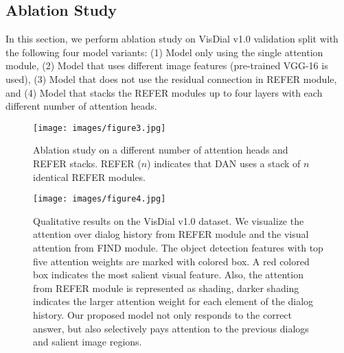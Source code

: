 \documentclass[11pt,a4paper]{article}
\begin{document}
\subsection{Ablation Study}
\label{sec:abl}
In this section, we perform ablation study on VisDial v1.0 validation split with the following four model variants: (1) Model only using the single attention module, (2) Model that uses different image features (pre-trained VGG-16 is used), (3) Model that does not use the residual connection in REFER module, and (4) Model that stacks the REFER modules up to four layers with each different number of attention heads.
\begin{table}
\centering
{}
\caption{Ablation studies on VisDial v1.0 validation split. 
Res and RPN denote the residual connection and the region proposal networks, respectively.}
\label{tab:t5}
\end{table}

\begin{figure}[ht]
\label{figure:architecture4}
\centering
\texttt{[image: images/figure3.jpg]}
\caption{Ablation study on a different number of attention heads and REFER stacks. REFER ($n$) indicates that DAN uses a stack of $n$ identical REFER modules.}
\end{figure}

\begin{figure*}[ht!]
\label{figure:architecture3}
\centering
\texttt{[image: images/figure4.jpg]}
\caption{Qualitative results on the VisDial v1.0 dataset. We visualize the attention over dialog history from REFER module and the visual attention from FIND module. The object detection features with top five attention weights are marked with colored box. A red colored box indicates the most salient visual feature.  Also, the attention from REFER module is represented as shading, darker shading indicates the larger attention weight for each element of the dialog history. Our proposed model not only responds to the correct answer, but also selectively pays attention to the previous dialogs and salient image regions.}
\end{figure*}
\end{document}
